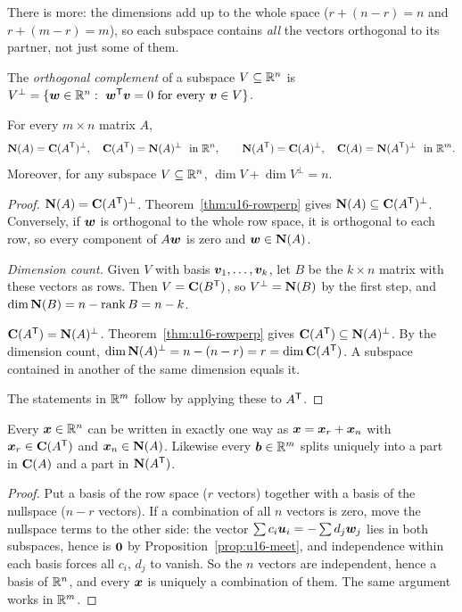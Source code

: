 There is more: the dimensions add up to the whole space ($r+(n-r)=n$ and $r+(m-r)=m$), so each
subspace contains \emph{all} the vectors orthogonal to its partner, not just some of them.

\begin{definition}\label{def:u16-complement}
The \emph{orthogonal complement} of a subspace $V\subseteq\mathbb{R}^n$ is
$V^{\perp}=\{\boldsymbol{w}\in\mathbb{R}^n:\ \boldsymbol{w}^{\mathsf{T}}\boldsymbol{v}=0\text{ for every }\boldsymbol{v}\in V\}$.
\end{definition}

\begin{theorem}\label{thm:u16-complements}
For every $m\times n$ matrix $A$,
\[
  \mathbf{N}(A)=\mathbf{C}(A^{\mathsf{T}})^{\perp},\quad \mathbf{C}(A^{\mathsf{T}})=\mathbf{N}(A)^{\perp}\ \ \text{in }\mathbb{R}^n,
  \qquad
  \mathbf{N}(A^{\mathsf{T}})=\mathbf{C}(A)^{\perp},\quad \mathbf{C}(A)=\mathbf{N}(A^{\mathsf{T}})^{\perp}\ \ \text{in }\mathbb{R}^m .
\]
Moreover, for any subspace $V\subseteq\mathbb{R}^n$, $\dim V+\dim V^{\perp}=n$.
\end{theorem}

\begin{proof}
\emph{$\mathbf{N}(A)=\mathbf{C}(A^{\mathsf{T}})^{\perp}$.} Theorem~\ref{thm:u16-rowperp} gives
$\mathbf{N}(A)\subseteq\mathbf{C}(A^{\mathsf{T}})^{\perp}$. Conversely, if $\boldsymbol{w}$ is orthogonal to the whole row
space, it is orthogonal to each row, so every component of $A\boldsymbol{w}$ is zero and
$\boldsymbol{w}\in\mathbf{N}(A)$.

\emph{Dimension count.} Given $V$ with basis $\boldsymbol{v}_1,\dots,\boldsymbol{v}_k$, let $B$ be the
$k\times n$ matrix with these vectors as rows. Then $V=\mathbf{C}(B^{\mathsf{T}})$, so
$V^{\perp}=\mathbf{N}(B)$ by the first step, and $\dim\mathbf{N}(B)=n-\operatorname{rank} B=n-k$.

\emph{$\mathbf{C}(A^{\mathsf{T}})=\mathbf{N}(A)^{\perp}$.} Theorem~\ref{thm:u16-rowperp} gives
$\mathbf{C}(A^{\mathsf{T}})\subseteq\mathbf{N}(A)^{\perp}$. By the dimension count,
$\dim\mathbf{N}(A)^{\perp}=n-(n-r)=r=\dim\mathbf{C}(A^{\mathsf{T}})$. A subspace contained in another of the same
dimension equals it.

The statements in $\mathbb{R}^m$ follow by applying these to $A^{\mathsf{T}}$.
\end{proof}

\begin{corollary}\label{cor:u16-split}
Every $\boldsymbol{x}\in\mathbb{R}^n$ can be written in exactly one way as $\boldsymbol{x}=\boldsymbol{x}_r+\boldsymbol{x}_n$ with
$\boldsymbol{x}_r\in\mathbf{C}(A^{\mathsf{T}})$ and $\boldsymbol{x}_n\in\mathbf{N}(A)$. Likewise every $\boldsymbol{b}\in\mathbb{R}^m$ splits
uniquely into a part in $\mathbf{C}(A)$ and a part in $\mathbf{N}(A^{\mathsf{T}})$.
\end{corollary}

\begin{proof}
Put a basis of the row space ($r$ vectors) together with a basis of the nullspace ($n-r$
vectors). If a combination of all $n$ vectors is zero, move the nullspace terms to the other
side: the vector $\sum c_i\boldsymbol{u}_i=-\sum d_j\boldsymbol{w}_j$ lies in both subspaces, hence is
$\boldsymbol{0}$ by Proposition~\ref{prop:u16-meet}, and independence within each basis forces all
$c_i$, $d_j$ to vanish. So the $n$ vectors are independent, hence a basis of $\mathbb{R}^n$, and
every $\boldsymbol{x}$ is uniquely a combination of them. The same argument works in $\mathbb{R}^m$.
\end{proof}

